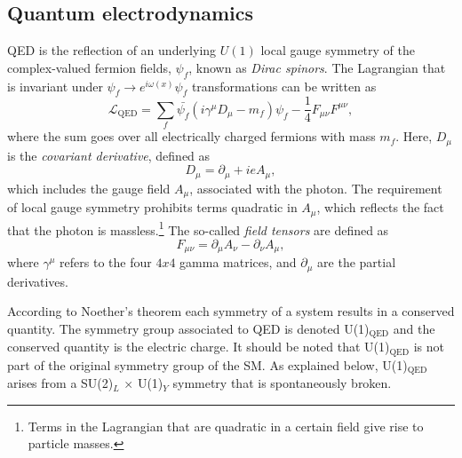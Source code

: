 \subsection{Quantum electrodynamics}
QED is the reflection of an underlying $U(1)$ local gauge symmetry of the complex-valued fermion fields, $\psi_f$, known as \emph{Dirac spinors}.
The Lagrangian that is invariant under $\psi_f \rightarrow e^{i \omega(x)} \psi_f$ transformations can be written as
\begin{equation}
  \mathcal{L}_{\text{QED}} = \sum_f \bar{\psi_f}(i\gamma^\mu D_\mu - m_f)\psi_f - \frac{1}{4}F_{\mu\nu}F^{\mu\nu},
  \label{eq:Lagrangianqed}
\end{equation}
where the sum goes over all electrically charged fermions with mass $m_f$.
Here, $D_\mu$ is the \emph{covariant derivative}, defined as
\begin{equation}
  D_\mu = \partial_\mu + ieA_\mu,
\end{equation}
which includes the gauge field $A_\mu$, associated with the photon. The requirement of local gauge symmetry prohibits terms quadratic in $A_\mu$, which reflects the fact that the photon is massless.\footnote{Terms in the Lagrangian that are quadratic in a certain field give rise to particle masses.}
The so-called \emph{field tensors} are defined as
\begin{equation}
  F_{\mu\nu} = \partial_\mu A_\nu - \partial_\nu A_\mu,
\end{equation}
where $\gamma^\mu$ refers to the four $4x4$ gamma matrices, and $\partial_\mu$ are the partial derivatives.

According to Noether's theorem each symmetry of a system results in a conserved quantity.
The symmetry group associated to QED is denoted U(1)$_{\text{QED}}$ and the conserved quantity is the electric charge.
It should be noted that U(1)$_{\text{QED}}$ is not part of the original symmetry group of the SM. As explained below, U(1)$_{\text{QED}}$ arises from a SU(2)$_L$ $\times$ U(1)$_Y$ symmetry that is spontaneously broken.


